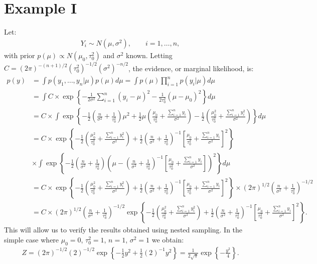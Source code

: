 \documentclass[11pt]{article}
\begin{document}
\section*{Example I}
Let:
\begin{align*}
Y_{i} \sim{} N(\mu,\sigma^{2}) , \qquad i=1,\ldots,n ,
\end{align*}
with prior $p(\mu)\propto{}N(\mu_{0},\tau_{0}^{2})$ and $\sigma^{2}$ known. Letting $C=(2\pi)^{-(n+1)/2}(\tau_{0}^{2})^{-1/2}(\sigma^{2})^{-n/2}$, the evidence, or marginal likelihood, is:
\begin{align*}
 p(y) &= \int p(y_{1},\ldots,y_{n}|\mu)p(\mu)d\mu = \int p(\mu)\prod_{i=1}^{n}p(y_{i}|\mu) d\mu \\
 &= \int C \times \exp\left\{-\frac{1}{2\sigma^{2}}\sum_{i=1}^{n}(y_{i}-\mu)^{2} -\frac{1}{2\tau_{0}^{2}}(\mu-\mu_{0})^{2} \right\} d\mu \\
 &= C \times \int \exp\left\{-\frac{1}{2}\left(\frac{n}{\sigma^{2}}+\frac{1}{\tau_{0}^{2}}\right)\mu^{2} + \frac{1}{2}\mu\left(\frac{\mu_{0}}{\tau_{0}^{2}} + \frac{\sum_{i=1}^{n}y_{i}}{\sigma^{2}}\right) - \frac{1}{2}\left(\frac{\mu_{0}^{2}}{\tau_{0}^{2}} + \frac{\sum_{i=1}^{n}y_{i}^{2}}{\sigma^{2}}\right) \right\} d\mu \\
  &= C \times \exp\left\{ - \frac{1}{2}\left(\frac{\mu_{0}^{2}}{\tau_{0}^{2}} + \frac{\sum_{i=1}^{n}y_{i}^{2}}{\sigma^{2}}\right)
  + \frac{1}{2}\left(\frac{n}{\sigma^{2}}+\frac{1}{\tau_{0}^{2}}\right)^{-1}\left[\frac{\mu_{0}}{\tau_{0}^{2}} + \frac{\sum_{i=1}^{n}y_{i}}{\sigma^{2}}\right]^{2}\right\} \\
  & \times  \int \exp\left\{ -\frac{1}{2}\left(\frac{n}{\sigma^{2}}+\frac{1}{\tau_{0}^{2}}\right)\left(\mu - \left(\frac{n}{\sigma^{2}}+\frac{1}{\tau_{0}^{2}}\right)^{-1}\left[\frac{\mu_{0}}{\tau_{0}^{2}} + \frac{\sum_{i=1}^{n}y_{i}}{\sigma^{2}}\right]\right)^{2} \right\}  d\mu \\
 &=  C\times\exp\left\{ - \frac{1}{2}\left(\frac{\mu_{0}^{2}}{\tau_{0}^{2}} + \frac{\sum_{i=1}^{n}y_{i}^{2}}{\sigma^{2}}\right)
  + \frac{1}{2}\left(\frac{n}{\sigma^{2}}+\frac{1}{\tau_{0}^{2}}\right)^{-1}\left[\frac{\mu_{0}}{\tau_{0}^{2}} + \frac{\sum_{i=1}^{n}y_{i}}{\sigma^{2}}\right]^{2}\right\} \times{} (2\pi)^{1/2}\left(\frac{n}{\sigma^{2}}+\frac{1}{\tau_{0}^{2}}\right)^{-1/2} \\
   &= C\times(2\pi)^{1/2}\left(\frac{n}{\sigma^{2}}+\frac{1}{\tau_{0}^{2}}\right)^{-1/2}\exp\left\{ - \frac{1}{2}\left(\frac{\mu_{0}^{2}}{\tau_{0}^{2}} + \frac{\sum_{i=1}^{n}y_{i}^{2}}{\sigma^{2}}\right)
  + \frac{1}{2}\left(\frac{n}{\sigma^{2}}+\frac{1}{\tau_{0}^{2}}\right)^{-1}\left[\frac{\mu_{0}}{\tau_{0}^{2}} + \frac{\sum_{i=1}^{n}y_{i}}{\sigma^{2}}\right]^{2}\right\} .
\end{align*}
This will allow us to verify the results obtained using nested sampling. In the simple case where $\mu_{0}=0$, $\tau_{0}^{2}=1$, $n=1$, $\sigma^{2}=1$ we obtain:
\begin{align*}
Z = (2\pi)^{-1/2}\left(2\right)^{-1/2}\exp\left\{ - \frac{1}{2}y^{2} + \frac{1}{2}\left(2\right)^{-1}y^{2}\right\}  = \frac{1}{2\sqrt{\pi}}\exp\left\{-\frac{y^{2}}{4}\right\} .
\end{align*}
\end{document}
